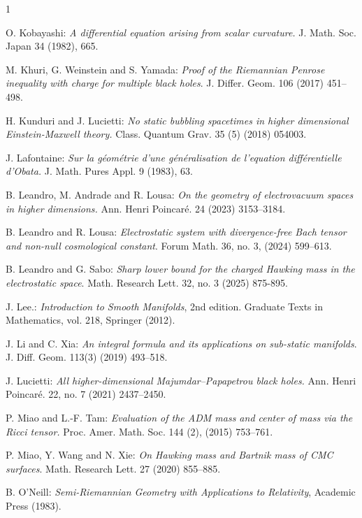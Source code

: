 \documentclass{amsart}
\numberwithin{equation}{section}
\begin{document}
\begin{thebibliography}{1}
		
 O. Kobayashi: \emph{A differential equation arising from scalar curvature.} J. Math. Soc. Japan 34 (1982), 665.


 M. Khuri, G. Weinstein and S. Yamada: \textit{Proof of the Riemannian Penrose inequality with charge for multiple black holes}. J. Differ. Geom. 106 (2017) 451--498.
		
		 H. Kunduri and J. Lucietti: {\em No static bubbling spacetimes in higher dimensional Einstein-Maxwell theory.} Class. Quantum Grav. 35 (5) (2018) 054003.
		
 J. Lafontaine:  \emph{Sur la géométrie d'une g\'en\'eralisation de l'equation diff\'erentielle d'Obata.} J. Math. Pures Appl. 9 (1983), 63.
		
		 B. Leandro, M. Andrade and R. Lousa: \emph{On the geometry of electrovacuum spaces in higher dimensions.} Ann. Henri Poincar\'e. 24  (2023) 3153--3184.
		
		 B. Leandro and R. Lousa: \emph{Electrostatic system with divergence-free Bach tensor and non-null cosmological constant}. Forum Math. 36, no. 3, (2024) 599--613.
		
		 B. Leandro and G. Sabo: \emph{Sharp lower bound for the charged Hawking mass in the electrostatic space}. Math. Research Lett. 32, no. 3 (2025) 875-895.
		
 J. Lee.: \emph{Introduction to Smooth Manifolds}, 2nd edition. Graduate Texts in Mathematics, vol. 218, Springer (2012).

 J. Li and C. Xia: {\it An integral formula and its applications on sub-static manifolds}. J. Diff. Geom. 113(3) (2019) 493--518.		
		
		 J. Lucietti: \emph{All higher-dimensional Majumdar–Papapetrou black holes.} Ann. Henri Poincar\'e. 22, no. 7 (2021) 2437–2450. 

		
		 P. Miao and L.-F. Tam: \emph{Evaluation of the ADM mass and center of mass via the Ricci tensor.} Proc. Amer. Math. Soc. 144 (2), (2015) 753--761.
	
	P. Miao, Y. Wang and N. Xie: {\it On Hawking mass and Bartnik mass of CMC surfaces}. Math. Research Lett. 27 (2020) 855--885.

		
 B. O'Neill: \emph{Semi-Riemannian Geometry with Applications to Relativity}, Academic Press (1983).		
		

\end{thebibliography}
\end{document}
